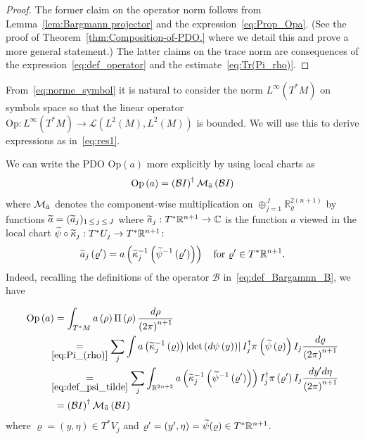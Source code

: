 \documentclass[AHL,Unicode,longabstracts,published]{cedram}
\newcommand{\clL}{\mathcal{L}}
\newcommand{\clM}{\mathcal{M}}
\newcommand{\clB}{\mathcal{B}}
\newcommand{\Opp}{\mathrm{Op}}
\newcommand{\bbR}{\mathbb{R}}
\newcommand{\bbC}{\mathbb{C}}
\let\oldtilde\tilde
\renewcommand*{\tilde}[1]{\mathchoice{\widetilde{#1}}{\widetilde{#1}}{\oldtilde{#1}}{\oldtilde{#1}}}
\newcommand{\bbR}{\mathbb{R}}
\begin{document}
\begin{proof}
The former claim on the operator norm follows from Lemma~\ref{lem:Bargmann projector} and the expression~\eqref{eq:Prop_Opa}. (See the proof of Theorem~\ref{thm:Composition-of-PDO.} where we detail this and prove a more general statement.) The latter claims on the trace norm are consequences of the expression~\eqref{eq:def_operator} and the estimate~\eqref{eq:Tr(Pi_rho)}.
\end{proof}
\begin{rema}
From~\eqref{eq:norme_symbol} it is natural to consider the norm $L^{\infty}(T^{*}M)$ on symbols space so that the linear operator $\Opp :L^{\infty}(T^{*}M)\rightarrow\clL(L^{2}(M),L^{2}(M))$ is bounded. We will use this to derive expressions as in~\eqref{eq:res1}.
\end{rema}


\begin{rema}
We can write the PDO $\Opp (a)$ more explicitly by using local charts as
\begin{equation}\label{eq:Prop_Opa}
\Opp \left(a\right)=\left(\clB I\right)^{\dagger}\clM_{\tilde{a}}\left(\clB I\right)
\end{equation}
where $\clM_{\tilde{a}}$ denotes the component-wise multiplication on $\oplus_{j=1}^{J}\bbR_{\varrho}^{2(n+1)}$ by functions $\tilde{a}=(\tilde{a}_{j})_{1\,\le\,j\,\le\,J}$ where $\tilde{a}_{j}:T^{*}\bbR^{n+1}\to\bbC$ is the function $a$ viewed in the local chart $\tilde{\psi}\circ\tilde{\kappa}_{j}:T^{*}U_{j}\to T^{*}\bbR^{n+1}$:
\begin{equation}\label{eq:def_a_tilde_j}
\tilde{a}_{j}\left(\varrho'\right)=a\left(\tilde{\kappa}_{j}^{-1}\left(\tilde{\psi}^{-1}\left(\varrho'\right)\right)\right)\quad\text{for }\varrho'\in T^{*}\bbR^{n+1}.
\end{equation}
Indeed, recalling the definitions of the operator $\clB$ in~\eqref{eq:def_Bargamnn_B}, we have
\end{rema}
\begin{equation}\label{eq:Op_a}
\begin{split}
\Opp \left(a\right) & =\int_{T^{*}M}a\left(\rho\right)\Pi\left(\rho\right)\frac{d\rho}{\left(2\pi\right)^{n+1}}
\\
& \mkern-10mu\underset{\eqref{eq:Pi_(rho)}}{=}\sum_{j}\int a\left(\tilde{\kappa}_{j}^{-1}\left(\varrho\right)\right)\left|\det \left(d\psi\left(y\right)\right)\right|I_{j}^{\dagger}\pi\left(\tilde{\psi}\left(\varrho\right)\right)I_{j}\frac{d\varrho}{\left(2\pi\right)^{n+1}} \\
& \mkern-10mu\underset{\eqref{eq:def_psi_tilde}}{=}\sum_{j}\int_{\bbR^{2n+2}}a\left(\tilde{\kappa}_{j}^{-1}\left(\tilde{\psi}^{-1}\left(\varrho'\right)\right)\right)I_{j}^{\dagger}\pi\left(\varrho'\right)I_{j}\frac{dy'd\eta}{\left(2\pi\right)^{n+1}} \\
& =\left(\clB I\right)^{\dagger}\clM_{\tilde{a}}\left(\clB I\right)
\end{split}
\end{equation}
where $\varrho=(y,\eta)\in T^{*}V_{j}$ and $\varrho'=(y',\eta)=\tilde{\psi}(\varrho)\in T^{*}\bbR^{n+1}$.
\end{document}
